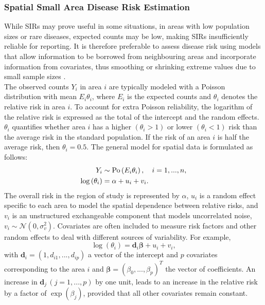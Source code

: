 \subsubsection{Spatial Small Area Disease Risk Estimation}
While SIRs may prove useful in some situations, in areas with low population sizes or rare diseases, expected counts may be low, making SIRs insufficiently reliable for reporting. It is therefore preferable to assess disease risk using models that allow information to be borrowed from neighbouring areas and incorporate information from covariates, thus smoothing or shrinking extreme values due to small sample sizes \autocite[][]{gelfand2010handbook}. \\
The observed counts $Y_i$ in area $i$ are typically modeled with a Poisson distribution with mean $E_i\theta_i$, where $E_i$ is the expected counts and $\theta_i$ denotes the relative risk in area $i$. To account for extra Poisson reliability, the logarithm of the relative risk is expressed as the total of the intercept and the random effects. $\theta_i$ quantifies whether area $i$ has a higher $\left(\theta_i >1\right)$ or lower $\left(\theta_i <1\right)$ risk than the average risk in the standard population. If the risk of an area $i$ is half the average risk, then $\theta_i = 0.5$. The general model for spatial data is formulated as follows:
\begin{align}
    Y_i&\sim\hbox{Po}\left(E_i\theta_i\right), \hspace{10pt} i=1,...,n,\\
    \log\left(\theta_i\right)&=\alpha+u_i+v_i.
\end{align}
The overall risk in the region of study is represented by $\alpha$, $u_i$ is a random effect specific to each area to model the spatial dependence between relative risks, and $v_i$ is an unstructured exchangeable component that models uncorrelated noise, $v_i\sim\mathcal{N}\left(0,\sigma_v^2\right)$. Covariates are often included to measure risk factors and other random effects to deal with different sources of variability. For example,
\begin{equation*}
    \log\left(\theta_i\right)=\pmb{d}_i\pmb{\beta}+u_i+v_i,
\end{equation*}
with $\pmb{d}_i = \left(1,d_{i1},...,d_{ip}\right)$ a vector of the intercept and $p$ covariates corresponding to the area $i$ and $\pmb{\beta}=\left(\beta_0,...,\beta_p\right)^T$ the vector of coefficients. An increase in $\pmb{d}_j\,\left(j = 1,...,p\right)$ by one unit, leads to an increase in the relative risk by a factor of $\exp\left(\beta_j\right)$, provided that all other covariates remain constant. \\
